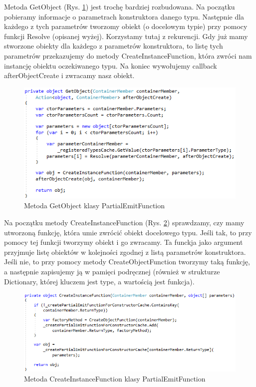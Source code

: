\documentclass[12pt]{article}
\begin{document}
Metoda GetObject (Rys. \ref{fig:PartialEmitFunction_GetObject}) jest trochę bardziej rozbudowana. Na początku pobieramy informacje o parametrach konstruktora danego typu. Następnie dla każdego z tych parametrów tworzomy obiekt (o docelowym typie) przy pomocy funkcji Resolve (opisanej wyżej). Korzystamy tutaj z rekurencji. Gdy już mamy stworzone obiekty dla każdego z parametrów konstruktora, to listę tych parametrów przekazujemy do metody CreateInstanceFunction, która zwróci nam instancję obiektu oczekiwanego typu. Na koniec wywołujemy callback afterObjectCreate i zwracamy nasz obiekt.\\
\begin{figure}[H]
	\begin{center}
  		\includegraphics{PartialEmitFunction_GetObject.png}
  		\caption{Metoda GetObject klasy PartialEmitFunction}
  		\label{fig:PartialEmitFunction_GetObject}
	\end{center}
\end{figure}

Na początku metody CreateInstanceFunction (Rys. \ref{fig:PartialEmitFunction_CreateInstanceFunction}) sprawdzamy, czy mamy utworzoną funkcję, która umie zwrócić obiekt docelowego typu. Jeśli tak, to przy pomocy tej funkcji tworzymy obiekt  i go zwracamy. Ta funckja jako argument przyjmuje listę obiektów w kolejności zgodnej z listą parametrów konstruktora. Jeśli nie, to przy pomocy metody CreateObjectFunction tworzymy taką funkcję, a następnie zapisujemy ją w pamięci podręcznej (również w strukturze Dictionary, której kluczem jest type, a wartością jest funkcja).\\
\begin{figure}[H]
	\begin{center}
  		\includegraphics{PartialEmitFunction_CreateInstanceFunction.png}
  		\caption{Metoda CreateInstanceFunction klasy PartialEmitFunction}
  		\label{fig:PartialEmitFunction_CreateInstanceFunction}
	\end{center}
\end{figure}
\end{document}
